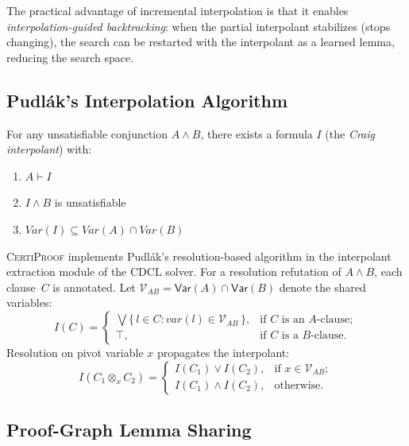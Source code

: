 \documentclass[acmtocl,review,anonymous]{acmart}
\newcommand{\proves}{\vdash}
\newcommand{\dland}{\mathbin{\wedge}}
\newcommand{\dlor}{\mathbin{\vee}}
\newcommand{\dltop}{\top}
\newcommand{\Var}{\mathsf{Var}}
\newcommand{\CP}{\textsc{CertiProof}}
\begin{document}
The practical advantage of incremental interpolation is that it
enables \emph{interpolation-guided backtracking}: when the partial
interpolant stabilizes (stops changing), the search can be restarted
with the interpolant as a learned lemma, reducing the search space.

\subsection{Pudl\'{a}k's Interpolation Algorithm}
\label{sec:pudlak}

\begin{theorem}
  For any unsatisfiable conjunction $A \wedge B$, there exists a
  formula $I$ (the \emph{Craig interpolant}) with:
  \begin{enumerate}
    \item[(i)]   $A \proves I$
    \item[(ii)]  $I \wedge B$ is unsatisfiable
    \item[(iii)] $\mathit{Var}(I) \subseteq
      \mathit{Var}(A) \cap \mathit{Var}(B)$
  \end{enumerate}
\end{theorem}

\CP{} implements Pudl\'{a}k's resolution-based algorithm in
the interpolant extraction module of the CDCL solver.  For a resolution
refutation of $A \wedge B$, each clause~$C$ is annotated.
Let $\mathcal{V}_{AB} = \Var(A) \cap \Var(B)$ denote the shared variables:
\begin{equation}
  I(C) = \begin{cases}
    \bigvee\{\,l \in C :
      \mathit{var}(l) \in \mathcal{V}_{AB}\,\},
      & \text{if $C$ is an $A$-clause}; \\[4pt]
    \dltop, & \text{if $C$ is a $B$-clause}.
  \end{cases}
\end{equation}
Resolution on pivot variable $x$ propagates the interpolant:
\begin{equation}
  I(C_1 \otimes_x C_2) =
  \begin{cases}
    I(C_1) \dlor I(C_2),
      & \text{if } x \in \mathcal{V}_{AB}; \\[4pt]
    I(C_1) \dland I(C_2),
      & \text{otherwise}.
  \end{cases}
\end{equation}

\subsection{Proof-Graph Lemma Sharing}
\end{document}
